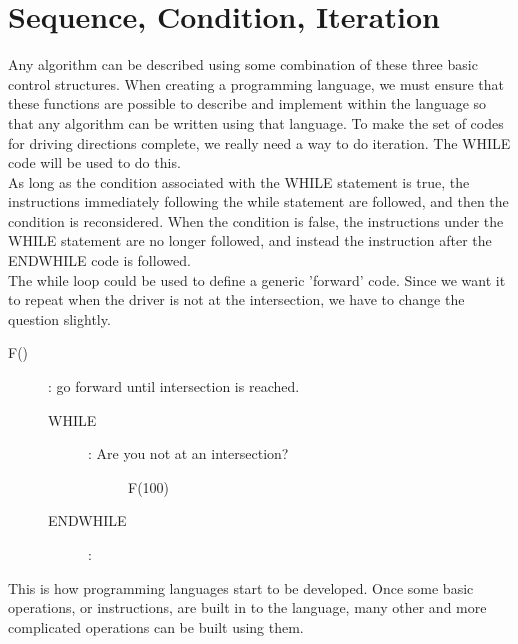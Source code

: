 \begin{center} \end{center}

\section{Sequence, Condition, Iteration}

Any algorithm can be described using some combination of these three basic control structures. When creating a programming language, we must ensure that these functions are possible to describe and implement within the language so that any algorithm can be written using that language. To make the set of codes for driving directions complete, we really need a way to do iteration. The WHILE code will be used to do this.\\

As long as the condition associated with the WHILE statement is true, the instructions immediately following the while statement are followed, and then the condition is reconsidered. When the condition is false, the instructions under the WHILE statement are no longer followed, and instead the instruction after the ENDWHILE code is followed.\\

The while loop could be used to define a generic 'forward' code. Since we want it to repeat when the driver is not at the intersection, we have to change the question slightly.\\

\begin{description}
	\item[F()] : go forward until intersection is reached.
	\begin{description}
		\item[WHILE]: Are you not at an intersection?
		\begin{description}
			\item[] F(100)
		\end{description}
		\item[ENDWHILE]:
	\end{description}
\end{description}

This is how programming languages start to be developed. Once some basic operations, or instructions, are built in to the language, many other and more complicated operations can be built using them.